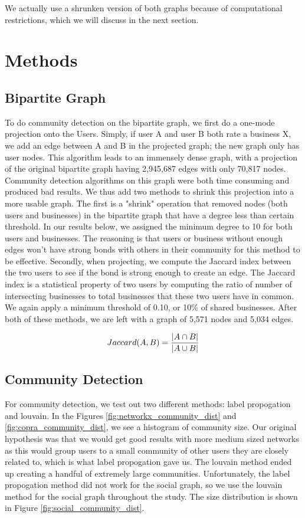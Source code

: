 \documentclass[10pt]{article}
\begin{document}
We actually use a shrunken version of both graphs because of computational restrictions, which we will discuss in the next section.

\section{Methods}

\subsection{Bipartite Graph}

To do community detection on the bipartite graph, we first do a one-mode projection onto the Users.  Simply, if user A and user B both rate a business X, we add an edge between A and B in the projected graph; the new graph only has user nodes.  This algorithm leads to an immensely dense graph, with a projection of the original bipartite graph having 2,945,687 edges with only 70,817 nodes.  Community detection algorithms on this graph were both time consuming and produced bad results.  We thus add two methods to shrink this projection into a more usable graph.  The first is a "shrink" operation that removed nodes (both users and businesses) in the bipartite graph that have a degree less than certain threshold.  In our results below, we assigned the minimum degree to 10 for both users and businesses.  The reasoning is that users or business without enough edges won't have strong bonds with others in their community for this method to be effective. Secondly, when projecting, we compute the Jaccard index between the two users to see if the bond is strong enough to create an edge.  The Jaccard index is a statistical property of two users by computing the ratio of number of intersecting businesses to total businesses that these two users have in common.  We again apply a minimum threshold of 0.10, or 10\% of shared businesses.  After both of these methods, we are left with a graph of 5,571 nodes and 5,034 edges.

\begin{equation}
Jaccard(A,B) = {{|A \cap B|}\over{|A \cup B|}}
\end{equation}

\subsection{Community Detection}

For community detection, we test out two different methods: label propogation\cite{gregory2010finding} and louvain\cite{blondel2008fast}.  In the Figures \ref{fig:networkx_community_dist} and \ref{fig:copra_community_dist}, we see a histogram of community size.  Our original hypothesis was that we would get good results with more medium sized networks as this would group users to a small community of other users they are closely related to, which is what label propogation gave us.  The louvain method ended up creating a handful of extremely large communities.  Unfortunately, the label propogation method did not work for the social graph, so we use the louvain method for the social graph throughout the study.  The size distribution is shown in Figure \ref{fig:social_community_dist}.
\end{document}
